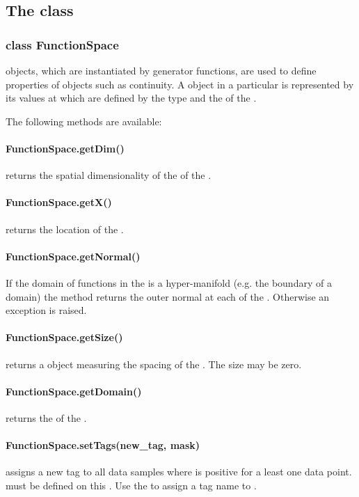 \subsection{The \FunctionSpace class}
\subsubsection*{class FunctionSpace}
\FunctionSpace objects, which are instantiated by generator functions, are
used to define properties of \Data objects such as continuity.
A \Data object in a particular \FunctionSpace is represented by its values at
\DataSamplePoints which are defined by the type and the \Domain of the \FunctionSpace.


\vspace{1em}\noindent The following methods are available:
%
\paragraph{FunctionSpace.getDim()}
returns the spatial dimensionality of the \Domain of the \FunctionSpace.

%
\paragraph{FunctionSpace.getX()}
returns the location of the \DataSamplePoints.

%
\paragraph{FunctionSpace.getNormal()}
If the domain of functions in the \FunctionSpace is a hyper-manifold (e.g.
    the boundary of a domain) the method returns the outer normal at each of
    the \DataSamplePoints. Otherwise an exception is raised.

%
\paragraph{FunctionSpace.getSize()}
returns a \Data object measuring the spacing of the \DataSamplePoints.
    The size may be zero.

%
\paragraph{FunctionSpace.getDomain()}
returns the \Domain of the \FunctionSpace.

%
\paragraph{FunctionSpace.setTags(new_tag, mask)}
assigns a new tag  to all data samples where  is
    positive for a least one data point.
     must be defined on this \FunctionSpace.
    Use the  to assign a tag name to .

